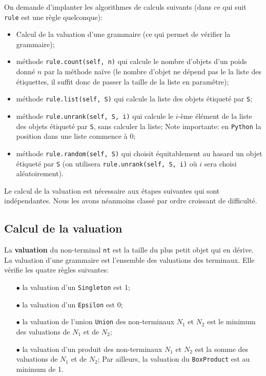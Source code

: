 \documentclass[11pt]{article}
\renewcommand{\emph}[1]{\textbf{#1}}
\newcommand{\Python}{\texttt{Python}}
\begin{document}
On demande d'implanter les algorithmes de calculs suivants (dans ce qui suit
\texttt{rule} est une règle quelconque):
\begin{itemize}
\item Calcul de la valuation d'une grammaire (ce qui permet de vérifier la
  grammaire);
\item méthode \verb+rule.count(self, n)+ qui calcule le nombre d'objets d'un
  poids donné $n$ par la méthode naïve (le nombre d'objet ne dépend pas le la
  liste des étiquettes, il suffit donc de passer la taille de la liste en
  paramêtre);
\item méthode \verb+rule.list(self, S)+ qui calcule la liste des objets
  étiqueté par \verb+S+;
\item méthode \verb+rule.unrank(self, S, i)+ qui calcule le $i$-ème élément de
  la liste des objets étiqueté par \verb+S+, sans calculer la liste; Note importante:
  en \Python{} la position dans une liste commence à $0$;
\item méthode \verb+rule.random(self, S)+ qui choisit équitablement au hasard
  un objet étiqueté par \verb+S+ (on utilisera \verb+rule.unrank(self, S, i)+ où $i$
  sera choisi aléatoirement).
\end{itemize}

Le calcul de la valuation est nécessaire aux étapes suivantes qui sont
indépendantes. Nous les avons néanmoins classé par ordre croissant de difficulté.

\subsection{Calcul de la valuation}

La \emph{valuation} du non-terminal \texttt{nt} est la taille du plus petit
objet qui en dérive. La valuation d'une grammaire est l'ensemble des
valuations des terminaux. Elle vérifie les quatre règles suivantes:
\begin{itemize}
\item[$\bullet$] la valuation d'un \texttt{Singleton} est 1;
\item[$\bullet$] la valuation d'un \texttt{Epsilon} est 0;
\item[$\bullet$] la valuation de l'union \texttt{Union} des non-terminaux
  $N_1$ et $N_2$ est le minimum des valuations de $N_1$ et de $N_2$;
\item[$\bullet$] la valuation d'un produit des non-terminaux $N_1$
  et $N_2$ est la somme des valuations de $N_1$ et de $N_2$; Par ailleurs,
  la valuation du \texttt{BoxProduct} est au minimum de 1.
\end{itemize}
\end{document}
